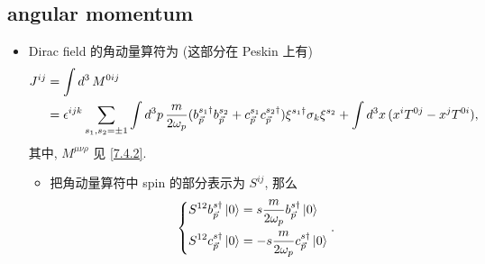 \subsection{angular momentum}
\begin{itemize}
	\item Dirac field 的角动量算符为 (这部分在 Peskin 上有)
	\begin{align}
		J^{i j} &= \int d^3 \, M^{0 i j} \notag \\
		&= \epsilon^{i j k} \sum_{s_1, s_2 = \pm 1} \int d^3 p \, \frac{m}{2 \omega_p} (b^{s_1 \dag}_{\vec{p}} b^{s_2}_{\vec{p}} + c^{s_1}_{\vec{p}} c^{s_2 \dag}_{\vec{p}}) \xi^{s_1 \dag} \sigma_k \xi^{s_2} + \int d^3 x \, (x^i T^{0 j} - x^j T^{0 i}),
	\end{align}
	其中, $M^{\mu \nu \rho}$ 见 \eqref{7.4.2}.
	\begin{itemize}
		\item 把角动量算符中 spin 的部分表示为 $S^{i j}$, 那么
		\begin{equation}
			\begin{dcases}
				S^{1 2} b^{s \dag}_{\vec{p}} \ket{0} = s \frac{m}{2 \omega_p} b^{s \dag}_{\vec{p}} \ket{0} \\
				S^{1 2} c^{s \dag}_{\vec{p}} \ket{0} = - s \frac{m}{2 \omega_p} c^{s \dag}_{\vec{p}} \ket{0}
			\end{dcases}.
		\end{equation}
	\end{itemize}
	

\end{itemize}
